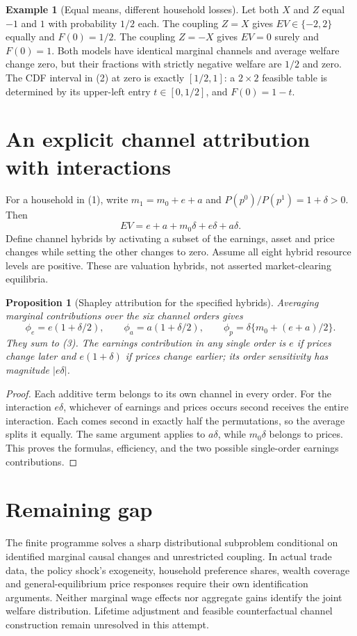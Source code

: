 \documentclass[11pt]{article}
\newtheorem{proposition}[theorem]{Proposition}
\theoremstyle{definition}
\newtheorem{example}[theorem]{Example}
\begin{document}
\begin{example}[Equal means, different household losses]
Let both $X$ and $Z$ equal $-1$ and $1$ with probability $1/2$ each.
The coupling $Z=X$ gives $EV\in\{-2,2\}$ equally and $F(0)=1/2$.
The coupling $Z=-X$ gives $EV=0$ surely and $F(0)=1$.
Both models have identical marginal channels and average welfare change zero,
but their fractions with strictly negative welfare are $1/2$ and zero.
The CDF interval in (2) at zero is exactly $[1/2,1]$: a $2\times2$
feasible table is determined by its upper-left entry $t\in[0,1/2]$,
and $F(0)=1-t$.
\end{example}

\section*{An explicit channel attribution with interactions}
For a household in (1), write $m_1=m_0+e+a$ and
$P(p^0)/P(p^1)=1+\delta>0$. Then
\[
 EV=e+a+m_0\delta+e\delta+a\delta. \tag{3}
\]
Define channel hybrids by activating a subset of the earnings, asset and
price changes while setting the other changes to zero. Assume all eight
hybrid resource levels are positive. These are valuation hybrids, not
asserted market-clearing equilibria.
\begin{proposition}[Shapley attribution for the specified hybrids]
Averaging marginal contributions over the six channel orders gives
\[
 \phi_e=e(1+\delta/2),\qquad
 \phi_a=a(1+\delta/2),\qquad
 \phi_p=\delta\{m_0+(e+a)/2\}.
\]
They sum to (3). The earnings contribution in any single order is $e$ if
prices change later and $e(1+\delta)$ if prices change earlier; its
order sensitivity has magnitude $|e\delta|$.
\end{proposition}
\begin{proof}
Each additive term belongs to its own channel in every order. For the
interaction $e\delta$, whichever of earnings and prices occurs second
receives the entire interaction. Each comes second in exactly half the
permutations, so the average splits it equally. The same argument applies
to $a\delta$, while $m_0\delta$ belongs to prices. This proves the formulas,
efficiency, and the two possible single-order earnings contributions.
\end{proof}

\section*{Remaining gap}
The finite programme solves a sharp distributional subproblem conditional
on identified marginal causal changes and unrestricted coupling. In actual
trade data, the policy shock's exogeneity, household preference shares,
wealth coverage and general-equilibrium price responses require their own
identification arguments. Neither marginal wage effects nor aggregate gains
identify the joint welfare distribution. Lifetime adjustment and feasible
counterfactual channel construction remain unresolved in this attempt.
\end{document}

